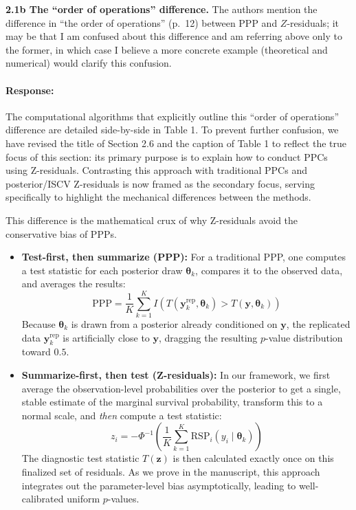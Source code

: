 \documentclass[11pt]{article}
\newcommand*{\mybox}[2]{%
  \par\medskip\noindent
  \colorbox{#1!30}{\parbox{.98\linewidth}{#2}}%
  \par\medskip
}
\begin{document}

\mybox{gray}{\textbf{2.1b The ``order of operations'' difference.} The authors mention the difference in ``the order of operations'' (p.~12) between PPP and $Z$-residuals; it may be that I am confused about this difference and am referring above only to the former, in which case I believe a more concrete example (theoretical and numerical) would clarify this confusion.}

\paragraph{Response:}

The computational algorithms that explicitly outline this ``order of operations'' difference are detailed side-by-side in Table 1. To prevent further confusion, we have revised the title of Section 2.6 and the caption of Table 1 to reflect the true focus of this section: its primary purpose is to explain how to conduct PPCs using Z-residuals. Contrasting this approach with traditional PPCs and posterior/ISCV Z-residuals is now framed as the secondary focus, serving specifically to highlight the mechanical differences between the methods.

This difference is the mathematical crux of why Z-residuals avoid the conservative bias of PPPs. 

\begin{itemize}
    \item \textbf{Test-first, then summarize (PPP):} For a traditional PPP, one computes a test statistic for each posterior draw $\bm{\theta}_k$, compares it to the observed data, and averages the results: 
    \[
    \text{PPP} = \frac{1}{K} \sum_{k=1}^K I\!\left(T(\bm{y}^{\text{rep}}_k, \bm{\theta}_k) > T(\bm{y}, \bm{\theta}_k)\right)
    \]
    Because $\bm{\theta}_k$ is drawn from a posterior already conditioned on $\bm{y}$, the replicated data $\bm{y}^{\text{rep}}_k$ is artificially close to $\bm{y}$, dragging the resulting $p$-value distribution toward $0.5$.
    
    \item \textbf{Summarize-first, then test (Z-residuals):} In our framework, we first average the observation-level probabilities over the posterior to get a single, stable estimate of the marginal survival probability, transform this to a normal scale, and \emph{then} compute a test statistic:
    \[
    z_i = -\Phi^{-1}\!\left( \frac{1}{K} \sum_{k=1}^K \text{RSP}_i(y_i \mid \bm{\theta}_k) \right)
    \]
    The diagnostic test statistic $T(\bm{z})$ is then calculated exactly once on this finalized set of residuals. As we prove in the manuscript, this approach integrates out the parameter-level bias asymptotically, leading to well-calibrated uniform $p$-values.
\end{itemize}
\end{document}
